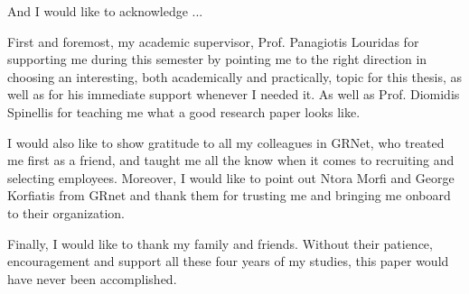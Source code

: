 
\begin{acknowledgements}      


And I would like to acknowledge ...

First and foremost,  my academic supervisor, Prof. Panagiotis Louridas
for supporting me during this semester by pointing me to the right
direction in choosing an interesting, both academically and practically,
topic for this thesis, as well as for his immediate support whenever I 
needed it. As well as Prof. Diomidis Spinellis for teaching me what a good
research paper looks like.

I would also like to show gratitude to all my colleagues in GRNet,
who treated me first as a friend, and taught me all the know when it comes to
recruiting and selecting employees. Moreover, I would like to point out Ntora Morfi
and George Korfiatis from GRnet and thank them for trusting me and bringing me onboard
to their organization.

Finally, I would like to thank my family and friends.
Without their patience, encouragement and support all these four years of my studies,
this paper would have never been accomplished.


\end{acknowledgements}
